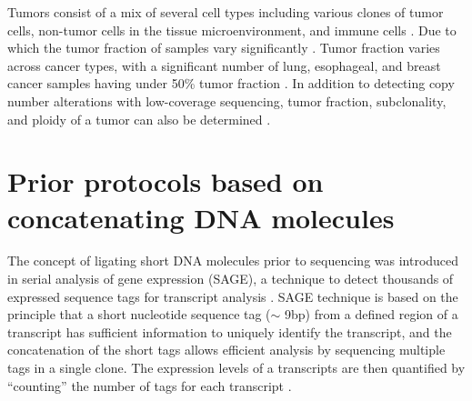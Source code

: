 Tumors consist of a mix of several cell types including various clones
of tumor cells, non-tumor cells in the tissue microenvironment, and
immune cells \citep{witz2006tumor}.
%
Due to which the tumor fraction of samples vary significantly
\citep{carter2012absolute,van2010allele,oesper2013theta}. Tumor fraction
varies across cancer types, with a significant number of lung,
esophageal, and breast cancer samples having under 50\% tumor fraction
\citep{carter2012absolute}.
%
In addition to detecting copy number alterations with low-coverage
sequencing, tumor fraction, subclonality, and ploidy of a tumor can also
be determined \citep{adalsteinsson2017scalable,gusnanto2012correcting}.



\section{Prior protocols based on concatenating DNA molecules}
The concept of ligating short DNA molecules prior
to sequencing was introduced in serial analysis of gene expression
(SAGE), a technique to detect thousands of expressed sequence
tags for transcript analysis \citep{velculescu1995serial}.
SAGE technique is based on the principle that a short nucleotide sequence
tag ($\sim$ 9bp) from a defined region of a transcript has sufficient
information to uniquely identify the transcript, and the concatenation
of the short tags allows efficient analysis by sequencing multiple tags
in a single clone. The expression levels of a transcripts are then
quantified by ``counting'' the number of tags for each transcript
\citep{velculescu1995serial}.
%

